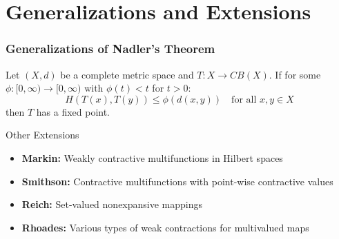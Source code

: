 \documentclass[aspectratio=169,10pt]{beamer}
\begin{document}

\section{Generalizations and Extensions}

\begin{frame}
\frametitle{Generalizations of Nadler's Theorem}

\begin{theorem}
Let $(X,d)$ be a complete metric space and $T: X \to CB(X)$.
If for some $\phi: [0,\infty) \to [0,\infty)$ with $\phi(t) < t$ for $t > 0$:
\[
H(T(x), T(y)) \leq \phi(d(x,y)) \quad \text{for all } x,y \in X
\]
then $T$ has a fixed point.
\end{theorem}

\vspace{0.3cm}

\begin{block}{Other Extensions}
\begin{itemize}
    \item \textbf{Markin:} Weakly contractive multifunctions in Hilbert spaces
    \item \textbf{Smithson:} Contractive multifunctions with point-wise contractive values
    \item \textbf{Reich:} Set-valued nonexpansive mappings
    \item \textbf{Rhoades:} Various types of weak contractions for multivalued maps
\end{itemize}
\end{block}

\end{frame}
\end{document}
